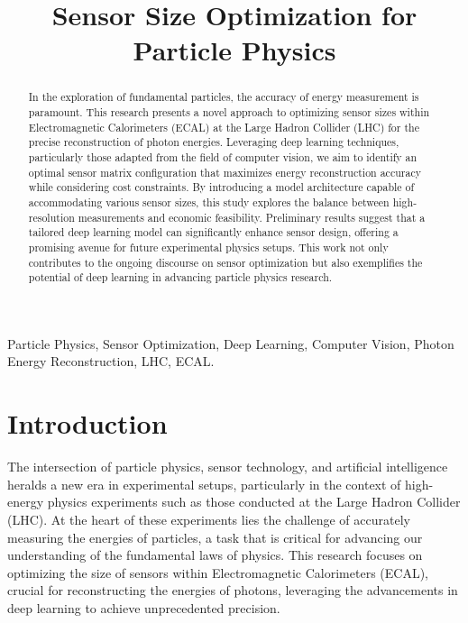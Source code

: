 \documentclass[conference]{IEEEtran}
\begin{document}
\title{Sensor Size Optimization for Particle Physics
}

\author{
}

\maketitle

\begin{abstract}
    In the exploration of fundamental particles, the accuracy of energy measurement is paramount. This research presents a novel approach to optimizing sensor sizes within Electromagnetic Calorimeters (ECAL) at the Large Hadron Collider (LHC) for the precise reconstruction of photon energies. Leveraging deep learning techniques, particularly those adapted from the field of computer vision, we aim to identify an optimal sensor matrix configuration that maximizes energy reconstruction accuracy while considering cost constraints. By introducing a model architecture capable of accommodating various sensor sizes, this study explores the balance between high-resolution measurements and economic feasibility. Preliminary results suggest that a tailored deep learning model can significantly enhance sensor design, offering a promising avenue for future experimental physics setups. This work not only contributes to the ongoing discourse on sensor optimization but also exemplifies the potential of deep learning in advancing particle physics research.
\end{abstract}

\begin{IEEEkeywords}
    Particle Physics, Sensor Optimization, Deep Learning, Computer Vision, Photon Energy Reconstruction, LHC, ECAL.
\end{IEEEkeywords}

\section{Introduction}
The intersection of particle physics, sensor technology, and artificial intelligence heralds a new era in experimental setups, particularly in the context of high-energy physics experiments such as those conducted at the Large Hadron Collider (LHC). At the heart of these experiments lies the challenge of accurately measuring the energies of particles, a task that is critical for advancing our understanding of the fundamental laws of physics. This research focuses on optimizing the size of sensors within Electromagnetic Calorimeters (ECAL), crucial for reconstructing the energies of photons, leveraging the advancements in deep learning to achieve unprecedented precision.
\end{document}
